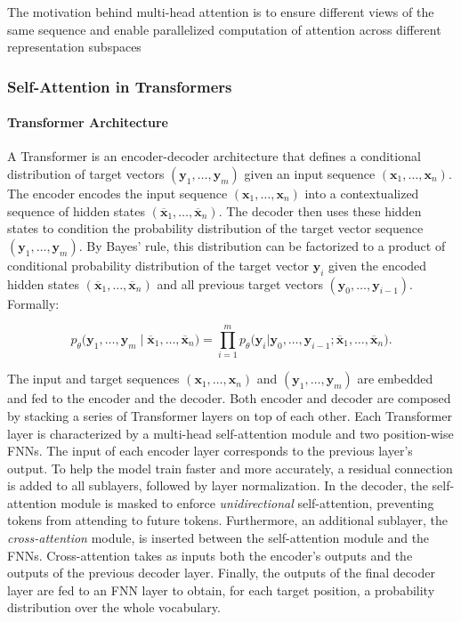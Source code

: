 The motivation behind multi-head attention is to ensure different views of the same sequence and enable parallelized computation of attention across different representation subspaces

 
\subsubsection{Self-Attention in Transformers}

\paragraph{Transformer Architecture} A Transformer \citep{vaswani2017attention} is an encoder-decoder architecture that defines a conditional distribution of target vectors $(\bm{y}_1, \ldots, \bm{y}_m)$ given an input sequence $(\bm{x}_1, \ldots, \bm{x}_n)$. The encoder encodes the input sequence $(\bm{x}_1, \ldots, \bm{x}_n)$ into a contextualized sequence of hidden states $(\overline{\bm{x}}_1, \ldots, \overline{\bm{x}}_n)$. The decoder then uses these hidden states to condition the probability distribution of the target vector sequence $(\bm{y}_1, \ldots, \bm{y}_m)$. By Bayes' rule, this distribution can be factorized to a product of conditional probability distribution of the target vector $\bm{y}_i$ given the encoded hidden states $(\overline{\bm{x}}_1, \ldots, \overline{\bm{x}}_n)$ and all previous target vectors $(\bm{y}_0, \ldots, \bm{y}_{i-1})$. Formally:

\begin{equation}
    p_{\theta} \bigl( \bm{y}_1, \ldots, \bm{y}_m \mid \overline{\bm{x}}_1, \ldots, \overline{\bm{x}}_n \bigr) = \prod_{i=1}^{m} p_{\theta}\bigl(\bm{y}_i |\bm{y}_0, \ldots, \bm{y}_{i-1}; \overline{\bm{x}}_1, \ldots, \overline{\bm{x}}_n\bigr).
\end{equation}

The input and target sequences $(\bm{x}_1, \ldots, \bm{x}_n)$ and $(\bm{y}_1, \ldots, \bm{y}_m)$ are embedded and fed to the encoder and the decoder. Both encoder and decoder are composed by stacking a series of Transformer layers on top of each other. Each Transformer layer is characterized by a multi-head self-attention module and two position-wise \acp{FNN}. The input of each encoder layer corresponds to the previous layer's output. To help the model train faster and more accurately, a residual connection \citep{he2016deep} is added to all sublayers, followed by layer normalization. In the decoder, the self-attention module is masked to enforce \textit{unidirectional} self-attention, preventing tokens from attending to future tokens. Furthermore, an additional sublayer, the \textit{cross-attention} module, is inserted between the self-attention module and the \acp{FNN}. Cross-attention takes as inputs both the encoder's outputs and the outputs of the previous decoder layer. Finally, the outputs of the final decoder layer are fed to an \ac{FNN} layer to obtain, for each target position, a probability distribution over the whole vocabulary.

